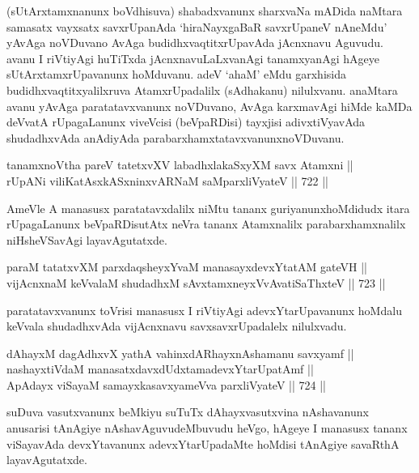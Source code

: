 \begin{artha} 
(sUtArxtamxnanunx boVdhisuva) shabadxvanunx sharxvaNa mADida naMtara 
samasatx vayxsatx savxrUpanAda `hiraNayxgaBaR savxrUpaneV nAneMdu'\break
yAvAga noVDuvano AvAga budidhxvaqtitxrUpavAda jAcnxnavu Aguvudu. avanu 
I riVtiyAgi huTiTxda jAcnxnavuLaLxvanAgi tanamxyanAgi hAgeye 
sUtArxtamxrUpavanunx hoMduvanu. adeV `ahaM' eMdu garxhisida 
budidhxvaqtitxyalilxruva AtamxrUpadalilx (sAdhakanu) nilulxvanu. 
anaMtara avanu yAvAga paratatavxvanunx noVDuvano, AvAga karxmavAgi 
hiMde kaMDa deVvatA rUpagaLanunx viveVcisi (beVpaRDisi) tayxjisi 
adivxtiVyavAda shudadhxvAda anAdiyAda parabarxhamxtatavxvanunx\break noVDuvanu.
\end{artha}

\begin{shl}
tanamxnoV\s tha pareV tatetxvXV labadhxlakaSxyXM savx Atamxni || \\
rUpANi viliKatAsxkASxninxvARNaM saMparxliVyateV \hfill || 722 ||  
\end{shl}

\begin{artha} 
AmeVle A manasusx paratatavxdalilx niMtu tananx guriyanunx\break hoMdidudx itara rUpagaLanunx beVpaRDisutAtx neVra tananx Atamxnalilx parabarxhamxnalilx niHsheVSavAgi layavAgutatxde.
\end{artha}

\begin{shl}
paraM tatatxvXM parxdaqsheyxYvaM manasayxdevxYtatAM gateVH || \\
vijAcnxnaM keVvalaM shudadhxM sAvxtamxneyxVvAvatiSaThxteV \hfill || 723 ||  
\end{shl}

\begin{artha} 
paratatavxvanunx toVrisi manasusx I riVtiyAgi adevxYtarUpavanunx hoMdalu keVvala shudadhxvAda vijAcnxnavu savxsavxrUpadalelx nilulxvadu.
\end{artha}

\begin{shl}
dAhayxM dagAdhxvX yathA vahinxdARhayxnAshamanu savxyamf || \\
nashayxtiVdaM manasatxdavxdUdxtamadevxYtarUpatAmf || \\
ApAdayx viSayaM samayxkasavxyameVva parxliVyateV \hfill || 724 ||  
\end{shl}

\begin{artha} 
suDuva vasutxvanunx beMkiyu suTuTx dAhayxvasutxvina nAshavanunx anusarisi tAnAgiye nAshavAguvudeMbuvudu heVgo, hAgeye I manasusx tananx viSayavAda devxYtavanunx adevxYtarUpadaMte hoMdisi tAnAgiye savaRthA layavAgutatxde.
\end{artha}

